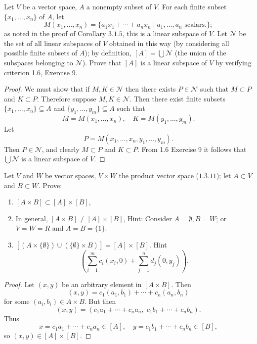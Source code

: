 \begin{tcolorbox}[title=Problem 5, breakable]
    Let $V$ be a vector space, $A$ a nonempty subset of $V$. For each finite
    subset $\{x_1, \ldots, x_n\}$ of $A$, let 
    \[M(x_1, \ldots, x_n) = \{a_1 x_1 + \cdots + a_n x_n \mid a_1, \ldots, a_n \text{ scalars.}\};\]
    as noted in the proof of Corollary $3.1.5$, this is a linear subspace of $V$.
    Let $\mathcal{N}$ be the set of all linear subspaces of $V$ obtained in this way
    (by considering all possible finite subsets of $A$); by definition,
    $[A] = \bigcup \mathcal{N}$ (the union of the subspaces belonging to $\mathcal{N}$).
    Prove that $[A]$ is a linear subspace of $V$ by verifying criterion 1.6, Exercise 9.
\end{tcolorbox}

\begin{proof}
    We must show that if $M, K \in \mathcal{N}$ then there exists $P \in \mathcal{N}$
    such that $M \subset P$ and $K \subset P$.
    Therefore suppose $M, K \in \mathcal{N}$. Then there exist finite subsets
    $\{x_1, \ldots, x_n\} \subseteq A$ and $\{y_1, \ldots, y_m\} \subseteq A$
    such that
    \[
        M = M(x_1, \ldots, x_n), \quad K = M(y_1, \ldots, y_m).
    \]
    Let
    \[
        P = M(x_1, \ldots, x_n, y_1, \ldots, y_m).
    \]
    Then $P \in \mathcal{N}$, and clearly $M \subset P$ and $K \subset P$.
    From 1.6 Exercise 9 it follows that $\bigcup \mathcal{N}$ is a linear subspace of $V$.
\end{proof}

\begin{tcolorbox}[title=Problem 6, breakable]
    Let $V$ and $W$ be vector spaces, $V \times W$ the product vector space ($1.3.11$);
    let $A \subset V$ and $B \subset W$. Prove:
    \begin{enumerate}
        \item $[A \times B] \subset [A] \times [B]$,
        \item In general, $[A \times B] \ne [A] \times [B]$, {Hint: Consider $A = \emptyset, B = W$; or $V = W = R$ and $A = B = \{1\}$.}
        \item $[(A \times \{\emptyset\}) \cup (\{\emptyset\} \times B)] = [A] \times [B]$. {Hint 
        \[\left(\sum_{i = 1}^{m} c_i (x_i, 0) + \sum_{j = 1}^{n} d_j (0, y_j) \right).\]    
        }
    \end{enumerate}
\end{tcolorbox}

\begin{proof}
    Let $(x, y)$ be an arbitrary element in $[A \times B]$.
    Then
    \[
    (x, y) = c_1 (a_1, b_1) + \cdots + c_n (a_n, b_n)
    \]
    for some $(a_i, b_i) \in A \times B$.
    But then 
    \[
    (x, y) = (c_1 a_1 + \cdots + c_n a_n,\; c_1 b_1 + \cdots + c_n b_n).
    \]
    Thus
    \[
    x = c_1 a_1 + \cdots + c_n a_n \in [A], \quad
    y = c_1 b_1 + \cdots + c_n b_n \in [B],
    \]
    so $(x, y) \in [A] \times [B]$.
\end{proof}

